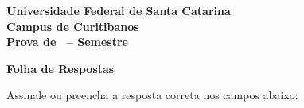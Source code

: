 \documentclass[10pt,a4paper]{article}
\makeatletter
\newcommand{\myCourse}{\@Course}
\newcommand{\mySemester}{\@Semester}
\newcommand{\myID}{\@ID}
\makeatother
\begin{document}
\thispagestyle{empty}
{\sf
\begin{center}
    \textbf{\LARGE Universidade Federal de Santa Catarina}\\[0.15cm]
    \textbf{\Large Campus de Curitibanos}\\[0.5cm]
    \textbf{\large Prova de \myCourse \ -- Semestre \mySemester} \hfill \textbf{\myID}
\end{center}

\vspace{0.3cm}

\noindent{}

\vspace*{0.8cm}

\textbf{\Large Folha de Respostas}

\vspace{0.3cm}
Assinale ou preencha a resposta correta nos campos abaixo:
\vspace{0.5cm}

}

\newpage

\begin{enumerate}
\setlength{\itemsep}{1.5em}
\end{enumerate}
\end{document}
